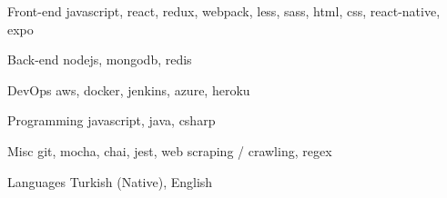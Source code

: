 

\begin{cvskills}

  \cvskill
    {Front-end} %
    {javascript, react, redux, webpack, less, sass, html, css, react-native, expo} %

  \cvskill
    {Back-end} %
    {nodejs, mongodb, redis} %

  \cvskill
    {DevOps} %
    {aws, docker, jenkins, azure, heroku } %

  \cvskill
    {Programming} %
    {javascript, java, csharp} %

  \cvskill
    {Misc} %
    {git, mocha, chai, jest, web scraping / crawling, regex} %

  \cvskill
    {Languages} %
    {Turkish (Native), English} %

\end{cvskills}
